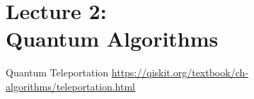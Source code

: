 \section{Lecture 2: \\ Quantum Algorithms}
\SectionPage{}

\begin{frame}{Quantum Teleportation}
\url{https://qiskit.org/textbook/ch-algorithms/teleportation.html}
\end{frame}